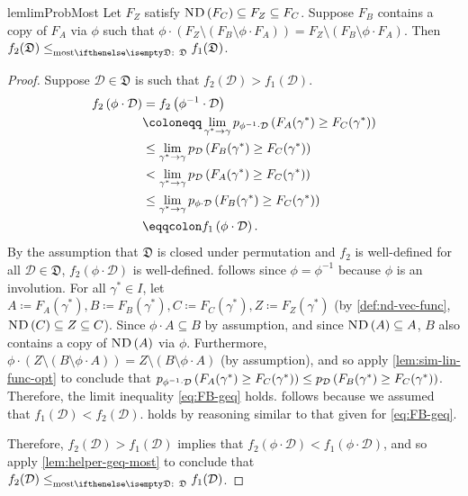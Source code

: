 \documentclass{article}
\newcommand*{\prn}[1]{\left(#1\right)}
\newcommand*{\defeq}{\coloneqq} %
\newcommand*{\eqdef}{\eqqcolon} %
\newcommand*{\upsc}[1]{\text{\upshape\textsc{#1}}}
\newcommand*{\D}{\mathcal{D}} %
\newcommand*{\distSet}{\mathfrak{D}}
\newcommand*{\ND}[1]{\upsc{ND}\prn{#1}}
\newcommand*{\inv}{^{-1}}
\theoremstyle{definition}
\begin{document}
\begin{appendices}
\begin{restatable}{lem}{limProbMost}
Let $F_Z$ satisfy $\ND{F_C}\subseteq F_Z \subseteq F_C$. Suppose $F_B$ contains a copy of $F_A$ via $\phi$ such that $\phi\cdot \prn{F_Z\setminus \prn{F_B\setminus \phi\cdot F_A}}=F_Z\setminus \prn{F_B\setminus \phi\cdot F_A}$. Then $f_2(\distSet) \leqMost[][\distSet] f_1(\distSet)$.
\end{restatable}
\begin{proof}
Suppose $\D\in\distSet$ is such that $f_2(\D)>f_1(\D)$. 
\begin{align}
    f_2\prn{\phi\cdot \D}&=f_2\prn{\phi\inv\cdot \D}\label{eq:involute-f1}\\
    &\defeq \lim_{\gamma^*\to \gamma}\phelper{F_A(\gamma^*)\geq F_C(\gamma^*)}[\phi\inv\cdot \D]\\
    &\leq \lim_{\gamma^*\to \gamma}\phelper{F_B(\gamma^*)\geq F_C(\gamma^*)}[\D]\label{eq:FB-geq}\\
    &<\lim_{\gamma^*\to \gamma}\phelper{F_A(\gamma^*)\geq F_C(\gamma^*)}[\D]\label{eq:assumed-ineq}\\
    &\leq  \lim_{\gamma^*\to \gamma}\phelper{F_B(\gamma^*)\geq F_C(\gamma^*)}[\phi\cdot \D]\label{eq:FB-geq-2}\\
    &\eqdef f_1\prn{\phi\cdot \D}.
\end{align}
By the assumption that $\distSet$ is closed under permutation and $f_2$ is well-defined for all $\D\in\distSet$, $f_2(\phi\cdot \D)$ is well-defined.  follows since $\phi=\phi\inv$ because $\phi$ is an involution. For all $\gamma^*\in I$, let $A\defeq F_A(\gamma^*), B\defeq F_B(\gamma^*), C\defeq F_C(\gamma^*), Z\defeq F_Z(\gamma^*)$ (by \cref{def:nd-vec-func}, $\ND{C}\subseteq Z \subseteq C$). Since $\phi\cdot A\subseteq B$ by assumption, and since $\ND{A}\subseteq A$, $B$ also contains a copy of $\ND{A}$ via $\phi$. Furthermore, $\phi\cdot \prn{Z\setminus \prn{B\setminus \phi\cdot A}}=Z\setminus \prn{B\setminus \phi\cdot A}$ (by assumption), and so apply  \cref{lem:sim-lin-func-opt} to conclude that $\phelper{F_A(\gamma^*)\geq F_C(\gamma^*)}[\phi\inv\cdot \D]\leq \phelper{F_B(\gamma^*)\geq F_C(\gamma^*)}[\D]$. Therefore, the limit inequality \cref{eq:FB-geq} holds.  follows because we assumed that $f_1(\D)<f_2(\D)$.  holds by reasoning similar to that given for \cref{eq:FB-geq}.

Therefore, $f_2(\D)>f_1(\D)$ implies that $f_2\prn{\phi\cdot \D}<f_1\prn{\phi\cdot \D}$, and so apply \cref{lem:helper-geq-most} to conclude that $f_2(\D) \leqMost[][\distSet] f_1(\D)$.
\end{proof}


\end{appendices}
\end{document}
